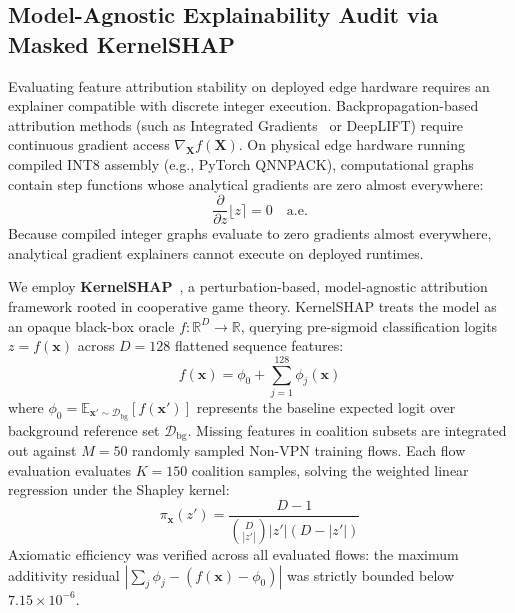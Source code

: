 \documentclass[conference]{IEEEtran}
\begin{document}
\subsection{Model-Agnostic Explainability Audit via Masked KernelSHAP}
\label{sec:kernel_shap}
Evaluating feature attribution stability on deployed edge hardware requires an explainer compatible with discrete integer execution. Backpropagation-based attribution methods (such as Integrated Gradients~\cite{b23} or DeepLIFT) require continuous gradient access $\nabla_{\mathbf{X}} f(\mathbf{X})$. On physical edge hardware running compiled INT8 assembly (e.g., PyTorch QNNPACK), computational graphs contain step functions whose analytical gradients are zero almost everywhere:
\begin{equation}
\frac{\partial}{\partial z} \lfloor z \rceil = 0 \quad \text{a.e.}
\label{eq:zero_grad}
\end{equation}
Because compiled integer graphs evaluate to zero gradients almost everywhere, analytical gradient explainers cannot execute on deployed runtimes.

We employ \textbf{KernelSHAP}~\cite{b4}, a perturbation-based, model-agnostic attribution framework rooted in cooperative game theory. KernelSHAP treats the model as an opaque black-box oracle $f: \mathbb{R}^D \to \mathbb{R}$, querying pre-sigmoid classification logits $z = f(\mathbf{x})$ across $D = 128$ flattened sequence features:
\begin{equation}
f(\mathbf{x}) = \phi_0 + \sum_{j=1}^{128} \phi_j(\mathbf{x})
\label{eq:shap_efficiency}
\end{equation}
where $\phi_0 = \mathbb{E}_{\mathbf{x}' \sim \mathcal{D}_{\text{bg}}}[f(\mathbf{x}')]$ represents the baseline expected logit over background reference set $\mathcal{D}_{\text{bg}}$. Missing features in coalition subsets are integrated out against $M = 50$ randomly sampled Non-VPN training flows. Each flow evaluation evaluates $K = 150$ coalition samples, solving the weighted linear regression under the Shapley kernel:
\begin{equation}
\pi_{\mathbf{x}}(z') = \frac{D - 1}{\binom{D}{|z'|} |z'| (D - |z'|)}
\label{eq:shap_kernel}
\end{equation}
Axiomatic efficiency was verified across all evaluated flows: the maximum additivity residual $|\sum_j \phi_j - (f(\mathbf{x}) - \phi_0)|$ was strictly bounded below $7.15 \times 10^{-6}$.
\end{document}
